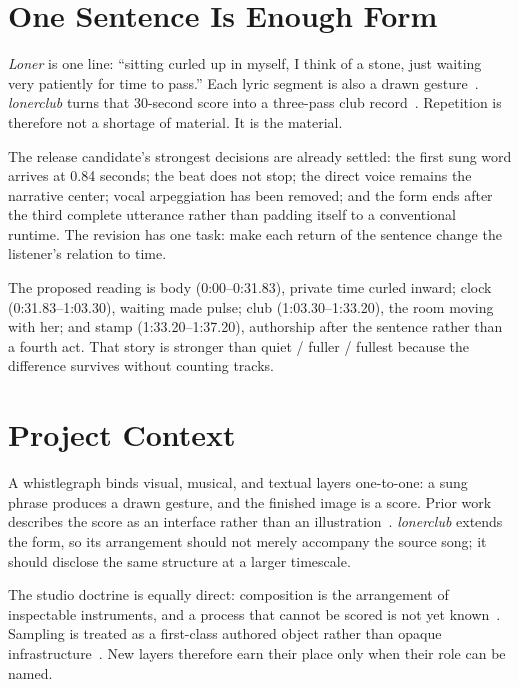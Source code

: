 \documentclass[10pt,letterpaper,twocolumn]{article}
\newcommand{\track}{\textit{lonerclub}}
\newcommand{\sourcework}{\textit{Loner}}
\begin{document}
\section{One Sentence Is Enough Form}

\sourcework{} is one line: ``sitting curled up in myself, I think of a stone, just waiting very patiently for time to pass.'' Each lyric segment is also a drawn gesture~\cite{klein2021loner,scudder2026whistlegraph}. \track{} turns that 30-second score into a three-pass club record~\cite{whistlegraph2026lonerclub}. Repetition is therefore not a shortage of material. It is the material.

The release candidate's strongest decisions are already settled: the first sung word arrives at 0.84 seconds; the beat does not stop; the direct voice remains the narrative center; vocal arpeggiation has been removed; and the form ends after the third complete utterance rather than padding itself to a conventional runtime. The revision has one task: make each return of the sentence change the listener's relation to time.

The proposed reading is body (0:00--0:31.83), private time curled inward; clock (0:31.83--1:03.30), waiting made pulse; club (1:03.30--1:33.20), the room moving with her; and stamp (1:33.20--1:37.20), authorship after the sentence rather than a fourth act. That story is stronger than quiet / fuller / fullest because the difference survives without counting tracks.

\section{Project Context}

A whistlegraph binds visual, musical, and textual layers one-to-one: a sung phrase produces a drawn gesture, and the finished image is a score. Prior work describes the score as an interface rather than an illustration~\cite{scudder2026whistlegraph}. \track{} extends the form, so its arrangement should not merely accompany the source song; it should disclose the same structure at a larger timescale.

The studio doctrine is equally direct: composition is the arrangement of inspectable instruments, and a process that cannot be scored is not yet known~\cite{scudder2026compstrats}. Sampling is treated as a first-class authored object rather than opaque infrastructure~\cite{scudder2026sampling}. New layers therefore earn their place only when their role can be named.
\end{document}
